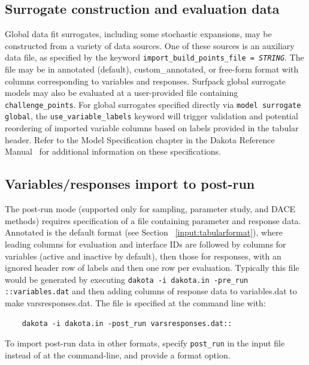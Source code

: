 \subsection{Surrogate construction and evaluation data}

Global data fit surrogates, including some stochastic expansions, may
be constructed from a variety of data sources.  One of these sources
is an auxiliary data file, as specified by the keyword
\texttt{import\_build\_points\_file = \emph{STRING}}.  The file may be
in annotated (default), custom\_annotated, or free-form format with
columns corresponding to variables and responses.  Surfpack global
surrogate models may also be evaluated at a user-provided file
containing \texttt{challenge\_points}.  For global surrogates
specified directly via \texttt{model surrogate global}, the
\texttt{use\_variable\_labels} keyword will trigger validation and
potential reordering of imported variable columns based on labels
provided in the tabular header. Refer to the Model
Specification chapter in the Dakota Reference Manual~\cite{RefMan} for
additional information on these specifications.

\subsection{Variables/responses import to post-run}

The post-run mode (supported only for sampling, parameter study, and
DACE methods) requires specification of a file containing parameter
and response data.  Annotated is the default format (see Section
~\ref{input:tabularformat}), where leading columns for evaluation and
interface IDs are followed by columns for variables (active and
inactive by default), then those for responses, with an ignored header
row of labels and then one row per evaluation.  Typically this file
would be generated by executing \texttt{dakota -i dakota.in -pre\_run
  ::variables.dat} and then adding columns of response data to
variables.dat to make varsresponses.dat.  The file is specified at the
command line with:
\begin{small}
\begin{verbatim}
    dakota -i dakota.in -post_run varsresponses.dat::
\end{verbatim}
\end{small}
To import post-run data in other formats, specify \texttt{post\_run}
in the input file instead of at the command-line, and provide a format
option.

